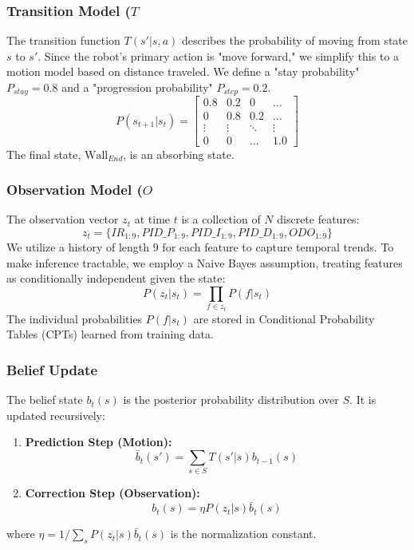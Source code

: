 \documentclass[10pt, twocolumn]{article}
\begin{document}
\subsubsection{Transition Model (\(T\)}
The transition function \(T(s' | s, a)\) describes the probability of moving from state \(s\) to \(s'\). Since the robot's primary action is "move forward," we simplify this to a motion model based on distance traveled. We define a "stay probability" \(P_{stay} = 0.8\) and a "progression probability" \(P_{step} = 0.2\).
\begin{equation}
P(s_{t+1} | s_t) = \begin{bmatrix}
0.8 & 0.2 & 0 & \dots \\
0 & 0.8 & 0.2 & \dots \\
\vdots & \vdots & \ddots & \vdots \\
0 & 0 & \dots & 1.0
\end{bmatrix}
\end{equation}
The final state, \(\text{Wall}_{End}\), is an absorbing state.

\subsubsection{Observation Model (\(O\)}
The observation vector \(z_t\) at time \(t\) is a collection of \(N\) discrete features:
\begin{equation}
z_t = \{ IR_{1:9}, PID\_P_{1:9}, PID\_I_{1:9}, PID\_D_{1:9}, ODO_{1:9} \}
\end{equation}
We utilize a history of length 9 for each feature to capture temporal trends. To make inference tractable, we employ a Naive Bayes assumption, treating features as conditionally independent given the state:
\begin{equation}
P(z_t | s_t) = \prod_{f \in z_t} P(f | s_t)
\end{equation}
The individual probabilities \(P(f | s_t)\) are stored in Conditional Probability Tables (CPTs) learned from training data.

\subsubsection{Belief Update}
The belief state \(b_t(s)\) is the posterior probability distribution over \(S\). It is updated recursively:
\begin{enumerate}
    \item \textbf{Prediction Step (Motion):}
    \begin{equation}
    \bar{b}_t(s') = \sum_{s \in S} T(s' | s) b_{t-1}(s)
    \end{equation}
    \item \textbf{Correction Step (Observation):}
    \begin{equation}
    b_t(s) = \eta P(z_t | s) \bar{b}_t(s)
    \end{equation}
\end{enumerate}
where \(\eta = 1 / \sum_{s} P(z_t | s) \bar{b}_t(s)\) is the normalization constant.
\end{document}
